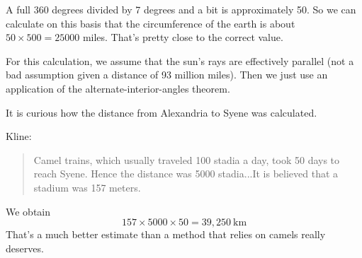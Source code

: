 \documentclass[11pt, oneside]{article}
\begin{document}
A full 360 degrees divided by 7 degrees and a bit is approximately 50.  So we can calculate on this basis that the circumference of the earth is about $50 \times 500 = 25000$ miles.  That's pretty close to the correct value.

For this calculation, we assume that the sun's rays are effectively parallel (not a bad assumption given a distance of 93 million miles).  Then we just use an application of the alternate-interior-angles theorem.

It is curious how the distance from Alexandria to Syene was calculated. 

Kline:

\begin{quote} Camel trains, which usually traveled 100 stadia a day, took 50 days to reach Syene.  Hence the distance was 5000 stadia...It is believed that a stadium was 157 meters.\end{quote}

We obtain
\[ 157 \times 5000 \times 50 = 39,250 \ \text{km} \]
That's a much better estimate than a method that relies on camels really deserves.
\end{document}
